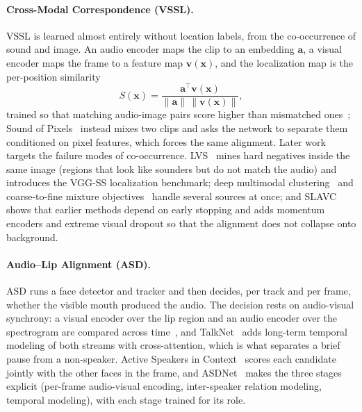 \paragraph{Cross-Modal Correspondence (VSSL).}
VSSL is learned almost entirely without location labels, from the co-occurrence of sound and image. An audio encoder maps the clip to an embedding $\mathbf{a}$, a visual encoder maps the frame to a feature map $\mathbf{v}(\mathbf{x})$, and the localization map is the per-position similarity
\begin{equation}
    S(\mathbf{x}) = \frac{\mathbf{a}^{\top}\mathbf{v}(\mathbf{x})}{\|\mathbf{a}\|\,\|\mathbf{v}(\mathbf{x})\|},
\end{equation}
trained so that matching audio-image pairs score higher than mismatched ones~\cite{senocak2018learning,owens2018audio}; Sound of Pixels~\cite{zhao2018sound} instead mixes two clips and asks the network to separate them conditioned on pixel features, which forces the same alignment. Later work targets the failure modes of co-occurrence. LVS~\cite{chen2021localizing} mines hard negatives inside the same image (regions that look like sounders but do not match the audio) and introduces the VGG-SS localization benchmark; deep multimodal clustering~\cite{hu2019deep} and coarse-to-fine mixture objectives~\cite{qian2020multiple} handle several sources at once; and SLAVC~\cite{mo2022closer} shows that earlier methods depend on early stopping and adds momentum encoders and extreme visual dropout so that the alignment does not collapse onto background.

\paragraph{Audio--Lip Alignment (ASD).}
ASD runs a face detector and tracker and then decides, per track and per frame, whether the visible mouth produced the audio. The decision rests on audio-visual synchrony: a visual encoder over the lip region and an audio encoder over the spectrogram are compared across time~\cite{afouras2020self}, and TalkNet~\cite{tao2021talknet} adds long-term temporal modeling of both streams with cross-attention, which is what separates a brief pause from a non-speaker. Active Speakers in Context~\cite{alcazar2020active} scores each candidate jointly with the other faces in the frame, and ASDNet~\cite{kopuklu2021how} makes the three stages explicit (per-frame audio-visual encoding, inter-speaker relation modeling, temporal modeling), with each stage trained for its role.

